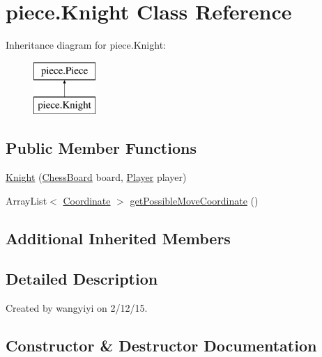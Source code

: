 \hypertarget{classpiece_1_1_knight}{}\section{piece.\+Knight Class Reference}
\label{classpiece_1_1_knight}
Inheritance diagram for piece.\+Knight\+:\begin{figure}[H]
\begin{center}
\leavevmode
\includegraphics[height=2.000000cm]{classpiece_1_1_knight}
\end{center}
\end{figure}
\subsection*{Public Member Functions}
\begin{DoxyCompactItemize}
\item 
\hyperlink{classpiece_1_1_knight_a74e148bd203ec7885971091cff1208ab}{Knight} (\hyperlink{classchess_1_1_chess_board}{Chess\+Board} board, \hyperlink{enumchess_1_1_player}{Player} player)
\item 
Array\+List$<$ \hyperlink{classpiece_1_1_coordinate}{Coordinate} $>$ \hyperlink{classpiece_1_1_knight_a1ac2e811908e6261d7e90bb5bed071c6}{get\+Possible\+Move\+Coordinate} ()
\end{DoxyCompactItemize}
\subsection*{Additional Inherited Members}


\subsection{Detailed Description}
Created by wangyiyi on 2/12/15. 

\subsection{Constructor \& Destructor Documentation}
\hypertarget{classpiece_1_1_knight_a74e148bd203ec7885971091cff1208ab}{}
